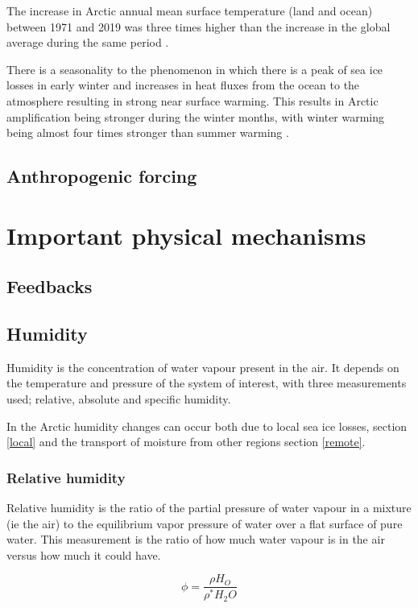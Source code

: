 \documentclass[11pt, oneside]{article}
\begin{document}
The increase in Arctic annual mean surface temperature (land and ocean) between 1971 and 2019 was three times higher than the increase in the global average during the same period \cite{AMAP}. 

There is a seasonality to the phenomenon in which there is a peak of sea ice losses in early winter and increases in heat fluxes from the ocean to the atmosphere resulting in strong near surface warming. This results in Arctic amplification being stronger during the winter months, with winter warming being almost four times stronger than summer warming \cite{bintanja2013changing}. 

\subsection{Anthropogenic forcing}

\section{Important physical mechanisms}

\subsection{Feedbacks}
\subsection{Humidity}\label{humidity}

Humidity is the concentration of water vapour present in the air. It depends on the temperature and pressure of the system of interest, with three measurements used; relative, absolute and specific humidity. 

In the Arctic humidity changes can occur both due to local sea ice losses, section \ref{local} and the transport of moisture from other regions section \ref{remote}. 



\subsubsection{Relative humidity}
Relative humidity is the ratio of the partial pressure of water vapour in a mixture (ie the air) to the equilibrium vapor pressure of water over a flat surface of pure water. This measurement is the ratio of how much water vapour is in the air versus how much it could have. 

\begin{equation}
    \phi = \frac{\rho H_O}{\rho^* H_2O}
\end{equation}
\end{document}
